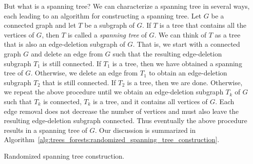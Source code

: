 But what is a spanning tree? We can characterize
a spanning tree in several ways, each leading to
an algorithm for constructing a spanning
tree. Let $G$ be a connected graph and let $T$ be a subgraph of
$G$. If $T$ is a tree that contains all the vertices of $G$, then $T$
is called a \emph{spanning tree} of $G$. We can
think of $T$ as a tree that is also an
edge-deletion subgraph of $G$. That is,
we start with a connected graph $G$ and delete an edge from $G$ such
that the resulting edge-deletion
subgraph $T_1$ is still connected. If $T_1$ is a tree, then we have
obtained a spanning tree of $G$. Otherwise, we
delete an edge from $T_1$ to obtain an
edge-deletion subgraph $T_2$ that is
still connected. If $T_2$ is a tree, then we are done. Otherwise, we
repeat the above procedure until we obtain an
edge-deletion subgraph $T_k$ of $G$ such
that $T_k$ is connected, $T_k$ is a tree, and it contains all vertices
of $G$. Each edge removal does not decrease the number of vertices and
must also leave the resulting
edge-deletion subgraph connected. Thus
eventually the above procedure results in a
spanning tree of $G$. Our discussion is
summarized in
Algorithm~\ref{alg:trees_forests:randomized_spanning_tree_construction}.

\begin{algorithm}[!htbp]

\caption{Randomized spanning tree construction.}
\label{alg:trees_forests:randomized_spanning_tree_construction}
\end{algorithm}

